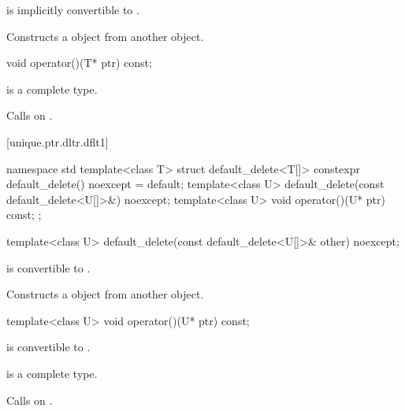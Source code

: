 \begin{itemdescr}
\pnum
\constraints
{} is implicitly convertible to .

\pnum
\effects
Constructs a  object
from another  object.
\end{itemdescr}

%
\begin{itemdecl}
void operator()(T* ptr) const;
\end{itemdecl}

\begin{itemdescr}
\pnum
\mandates
{} is a complete type.

\pnum
\effects
Calls  on .
\end{itemdescr}

[unique.ptr.dltr.dflt1]{}

\begin{codeblock}
namespace std {
  template<class T> struct default_delete<T[]> {
    constexpr default_delete() noexcept = default;
    template<class U> default_delete(const default_delete<U[]>&) noexcept;
    template<class U> void operator()(U* ptr) const;
  };
}
\end{codeblock}

\begin{itemdecl}
template<class U> default_delete(const default_delete<U[]>& other) noexcept;
\end{itemdecl}

\begin{itemdescr}
\pnum
\constraints
{} is convertible to .

\pnum
\effects
Constructs a  object from another  object.
\end{itemdescr}

%
\begin{itemdecl}
template<class U> void operator()(U* ptr) const;
\end{itemdecl}

\begin{itemdescr}
\pnum
\constraints
{} is convertible to .

\pnum
\mandates
{} is a complete type.

\pnum
\effects
Calls  on .
\end{itemdescr}

